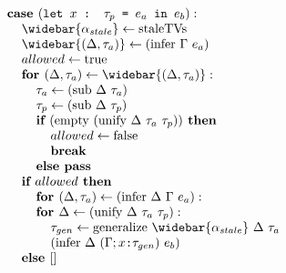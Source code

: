 \documentclass[acmsmall]{acmart}
\begin{document}
\begin{figure*}[h]
\[\begin{array}[t]{@{} l}
    \\

    \I \B{case } (\code{let $x$ : $\tau_p$ = $e_a$ in $e_b$}) :  
    \\
    \I\I \widebar{\alpha_{stale}} \leftarrow \F{staleTVs}
    \\
    \I\I \widebar{(\Delta, \tau_a)} \leftarrow (\F{infer } \Gamma\ e_a)
    \\
    \I\I allowed \leftarrow \F{true}
    \\
    \I\I \B{for } (\Delta, \tau_a) \leftarrow \widebar{(\Delta, \tau_a)}:
    \\
    \I\I\I \tau_a \leftarrow (\text{sub } \Delta\ \tau_a)
    \\
    \I\I\I \tau_p \leftarrow (\text{sub } \Delta\ \tau_p)
    \\
    \I\I\I \B{if } (\F{empty } (\F{unify } \Delta\ \tau_a\ \tau_p)) \B{ then }
    \\
    \I\I\I\I allowed \leftarrow \F{false}
    \\
    \I\I\I\I \B{break}
    \\
    \I\I\I \B{else } \B{pass}
    \\
    \I\I \B{if } allowed \B{ then }
    \\
    \I\I\I \B{for } (\Delta, \tau_a) \leftarrow (\F{infer } \Delta\ \Gamma\ e_a):
    \\
    \I\I\I \B{for } \Delta \leftarrow (\F{unify } \Delta\ \tau_a\ \tau_p):
    \\
    \I\I\I\I \tau_{gen} \leftarrow \F{generalize } \widebar{\alpha_{stale}}\ \Delta\ \tau_a
    \\
    \I\I\I\I (\F{infer } \Delta\ (\Gamma;\code{$x$:$\tau_{gen}$})\ e_b)
    \\
    \I\I \B{else } [] 

    \\


\end{array}\]
\end{figure*}
\end{document}
